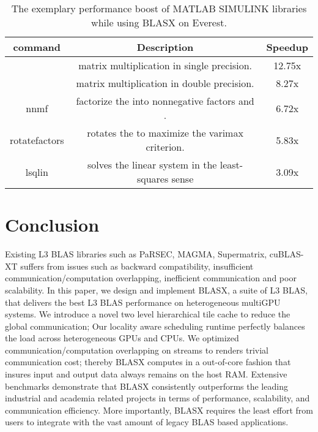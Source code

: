\documentclass[conference]{IEEEtran}
\begin{document}
\begin{inparaenum} 
\begin{table}[t]
\centering
\caption{The exemplary performance boost of MATLAB SIMULINK libraries while using BLASX on Everest.}
\label{MATLAB}
\begin{tabular}{c c c}
     \toprule
      command     &  Description                &   Speedup                         \\  \midrule
       & matrix multiplication in single precision. & 12.75x \\
       & matrix multiplication in double precision. & 8.27x  \\
      nnmf     & factorize the  into nonnegative factors  and . & 6.72x       \\ 
      rotatefactors  & rotates the  to maximize the varimax criterion.      & 5.83x                   \\
      lsqlin   & solves the linear system in the least-squares sense & 3.09x \\
    \bottomrule
\end{tabular}
\vspace{-0.2in}
\end{table}


\end{inparaenum}


\section{Conclusion}
Existing L3 BLAS libraries such as PaRSEC, MAGMA, Supermatrix, cuBLAS-XT suffers from issues such as backward compatibility,
insufficient communication/computation overlapping, inefficient communication and poor scalability. In this paper, 
we design and implement BLASX, a suite of L3 BLAS, that delivers the best L3 BLAS performance on heterogeneous multiGPU systems. 
We introduce a novel two level hierarchical tile cache to reduce the global communication; Our locality aware scheduling 
runtime perfectly balances the load across heterogeneous GPUs and CPUs. We optimized communication/computation 
overlapping on streams to renders trivial communication cost; thereby BLASX computes in a out-of-core fashion that insures input and output 
data always remains on the host RAM. Extensive benchmarks demonstrate that BLASX consistently outperforms the leading industrial and academia related projects
in terms of performance, scalability, and communication efficiency. More importantly, BLASX requires the least effort from users to integrate with
the vast amount of legacy BLAS based applications.
\end{document}
